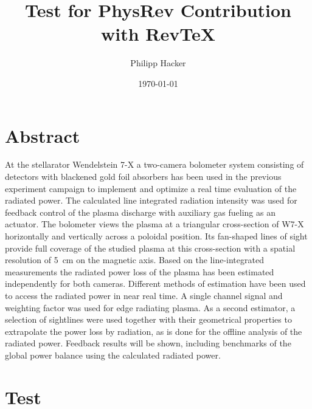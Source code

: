 \documentclass[%
	aps,%
	twocolumn,%
	secnumarabic,%
	amssymb,%
	prd,%
	10pt
	]{revtex4-1}
\begin{document}
\title{%
	Test for PhysRev Contribution with Rev\TeX%
	}
\author{Philipp Hacker}
\date{\today}
\maketitle
\tableofcontents


\section{Abstract}
	At the stellarator Wendelstein 7-X a two-camera bolometer system consisting of detectors with blackened gold foil absorbers has been used in the previous experiment campaign to implement and optimize a real time evaluation of the radiated power. The calculated line integrated radiation intensity was used for feedback control of the plasma discharge with auxiliary gas fueling as an actuator. The bolometer views the plasma at a triangular cross-section of W7-X horizontally and vertically across a poloidal position. Its fan-shaped lines of sight provide full coverage of the studied plasma at this cross-section with a spatial resolution of \SI{5}{\centi\meter} on the magnetic axis. Based on the line-integrated measurements the radiated power loss of the plasma has been estimated independently for both cameras. Different methods of estimation have been used to access the radiated power in near real time. A single channel signal and weighting factor was used for edge radiating plasma. As a second estimator, a selection of sightlines were used together with their geometrical properties to extrapolate the power loss by radiation, as is done for the offline analysis of the radiated power. Feedback results will be shown, including benchmarks of the global power balance using the calculated radiated power.


\section{Test}
\end{document}
